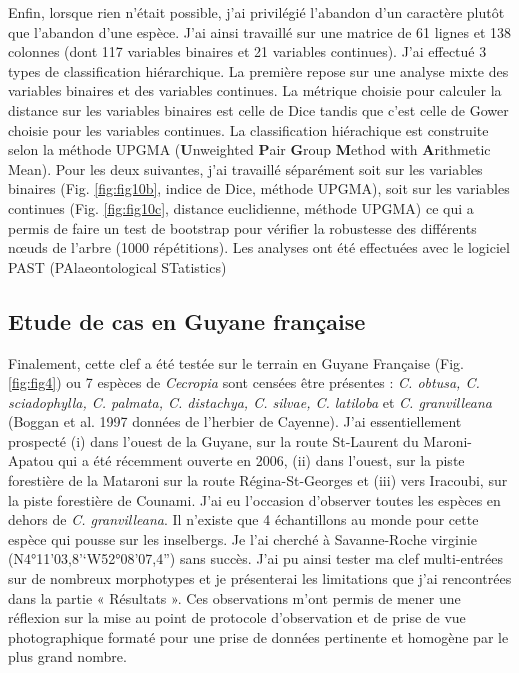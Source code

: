 \documentclass[a4paper]{article}
\theoremstyle{definition}
\theoremstyle{definition}
\theoremstyle{definition}
\theoremstyle{remark}
\begin{document}
Enfin, lorsque rien n'était possible, j'ai privilégié l'abandon d'un
caractère plutôt que l'abandon d'une espèce. J'ai ainsi travaillé sur
une matrice de 61 lignes et 138 colonnes (dont 117 variables binaires et
21 variables continues). J'ai effectué 3 types de classification
hiérarchique. La première repose sur une analyse mixte des variables
binaires et des variables continues. La métrique choisie pour calculer
la distance sur les variables binaires est celle de Dice
\citeyearpar{Dice1945} tandis que c'est celle de Gower
\citeyearpar{Gower1971} choisie pour les variables continues. La
classification hiérachique est construite selon la méthode UPGMA
(\textbf{U}nweighted \textbf{P}air \textbf{G}roup \textbf{M}ethod with
\textbf{A}rithmetic Mean). Pour les deux suivantes, j'ai travaillé
séparément soit sur les variables binaires (Fig. \ref{fig:fig10b},
indice de Dice, méthode UPGMA), soit sur les variables continues (Fig.
\ref{fig:fig10c}, distance euclidienne, méthode UPGMA) ce qui a permis
de faire un test de bootstrap pour vérifier la robustesse des différents
nœuds de l'arbre (1000 répétitions). Les analyses ont été effectuées
avec le logiciel PAST (PAlaeontological STatistics) \citep{Clarke1993}

\subsection{Etude de cas en Guyane
française}\label{etude-de-cas-en-guyane-francaise}

Finalement, cette clef a été testée sur le terrain en Guyane Française
(Fig. \ref{fig:fig4}) ou 7 espèces de \emph{Cecropia} sont censées être
présentes : \emph{C. obtusa, C. sciadophylla, C. palmata, C. distachya,
C. silvae, C. latiloba} et \emph{C. granvilleana} (Boggan et al. 1997
données de l'herbier de Cayenne). J'ai essentiellement prospecté (i)
dans l'ouest de la Guyane, sur la route St-Laurent du Maroni-Apatou qui
a été récemment ouverte en 2006, (ii) dans l'ouest, sur la piste
forestière de la Mataroni sur la route Régina-St-Georges et (iii) vers
Iracoubi, sur la piste forestière de Counami. J'ai eu l'occasion
d'observer toutes les espèces en dehors de \emph{C. granvilleana}. Il
n'existe que 4 échantillons au monde pour cette espèce qui pousse sur
les inselbergs. Je l'ai cherché à Savanne-Roche virginie
(N4°11'03,8'`W52°08'07,4'') sans succès. J'ai pu ainsi tester ma clef
multi-entrées sur de nombreux morphotypes et je présenterai les
limitations que j'ai rencontrées dans la partie « Résultats ». Ces
observations m'ont permis de mener une réflexion sur la mise au point de
protocole d'observation et de prise de vue photographique formaté pour
une prise de données pertinente et homogène par le plus grand nombre.
\end{document}
